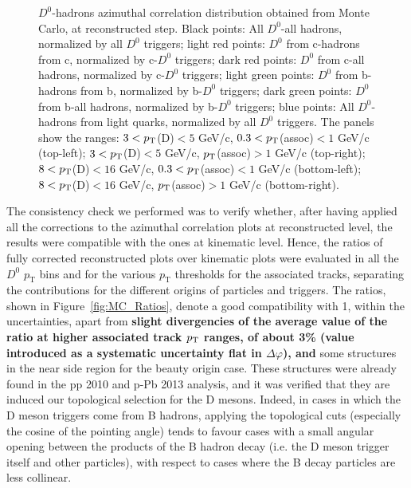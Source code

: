 \begin{figure}
\caption{$D^0$-hadrons azimuthal correlation distribution obtained from Monte Carlo, at reconstructed step. Black points: All $D^0$-all hadrons, normalized by all $D^0$ triggers; light red points: $D^0$ from c-hadrons from c, normalized by c-$D^0$ triggers; dark red points: $D^0$ from c-all hadrons, normalized by c-$D^0$ triggers; light green points: $D^0$ from b-hadrons from b, normalized by b-$D^0$ triggers; dark green points: $D^0$ from b-all hadrons, normalized by b-$D^0$ triggers; blue points: All $D^0$-hadrons from light quarks, normalized by all $D^0$ triggers.
The panels show the ranges: $3 < p_{\rm T}$(D)$ < 5$ GeV/c, $0.3 < p_{\rm T}$(assoc)$ < 1$ GeV/c (top-left); $3 < p_{\rm T}$(D)$ < 5$ GeV/c, $p_{\rm T}$(assoc)$ > 1$ GeV/c (top-right); $8 < p_{\rm T}$(D)$ < 16$ GeV/c, $0.3 < p_{\rm T}$(assoc)$ < 1$ GeV/c (bottom-left); $8 < p_{\rm T}$(D)$ < 16$ GeV/c, $p_{\rm T}$(assoc)$ > 1$ GeV/c (bottom-right).}
\label{fig:MC_Reco}
\end{figure}

The consistency check we performed was to verify whether, after having applied all the corrections to the azimuthal correlation plots at reconstructed level, the results were compatible with the ones at kinematic level. Hence, the ratios of fully corrected reconstructed plots over kinematic plots were evaluated in all the $D^0$ $p_\text{T}$ bins and for the various $p_\text{T}$ thresholds for the associated tracks, separating the contributions for the different origins of particles and triggers. The ratios, shown in Figure~\ref{fig:MC_Ratios}, denote a good compatibility with 1, within the uncertainties, apart from {\bf slight divergencies of the average value of the ratio at higher associated track $p_{\rm T}$ ranges, of about 3\% (value introduced as a systematic uncertainty flat in $\Delta\varphi$), and} some structures in the near side region for the beauty origin case.
These structures were already found in the pp 2010 and p-Pb 2013 analysis, and it was verified that they are induced our topological selection for the D mesons. Indeed, in cases in which the D meson triggers come from B hadrons, applying the topological cuts (especially the cosine of the pointing angle) tends to favour cases with a small angular opening between the products of the B hadron decay (i.e. the D meson trigger itself and other particles), with respect to cases where the B decay particles are less collinear.

